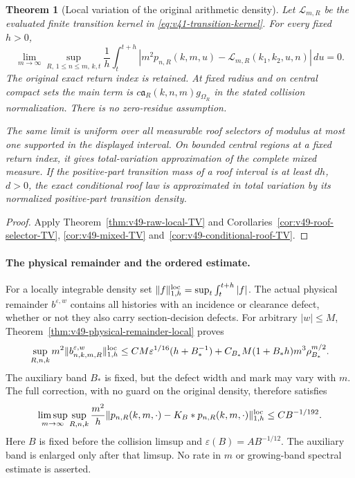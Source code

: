 \documentclass[11pt,reqno]{amsart}
\numberwithin{equation}{section}
\newtheorem{leadtheorem}{Theorem}
\theoremstyle{definition}\newtheorem{definition}[theorem]{Definition}
\theoremstyle{remark}\newtheorem{remark}[theorem]{Remark}
\begin{document}
\begin{leadtheorem}[Local variation of the original arithmetic density]
\label{thm:intro-v49-local-TV}
Let $\mathcal L_{m,R}$ be the evaluated finite transition kernel in
\eqref{eq:v41-transition-kernel}. For every fixed $h>0$,
\[
 \lim_{m\to\infty}\sup_{R,\,1\le n\le m,\,k,t}
 \frac1h\int_t^{t+h}
 |m^2p_{n,R}(k,m,u)-\mathcal L_{m,R}(k_1,k_2,u,n)|\,du=0.
\]
The original exact return index is retained. At fixed radius and on
central compact sets the main term is
$c\mathfrak a_R(k,n,m)g_{\Omega_R}$ in the stated collision
normalization. There is no zero-residue assumption.

The same limit is uniform over all measurable roof selectors of
modulus at most one supported in the displayed interval. On bounded
central regions at a fixed return index, it gives total-variation
approximation of the complete mixed measure. If the positive-part
transition mass of a roof interval is at least $dh$, $d>0$, the exact
conditional roof law is approximated in total variation by its
normalized positive-part transition density.
\end{leadtheorem}
\begin{proof}
Apply Theorem~\ref{thm:v49-raw-local-TV} and
Corollaries~\ref{cor:v49-roof-selector-TV}, \ref{cor:v49-mixed-TV}
and~\ref{cor:v49-conditional-roof-TV}.
\end{proof}

\paragraph{The physical remainder and the ordered estimate.}
For a locally integrable density set
$\|f\|_{1,h}^{\rm loc}=\sup_t\int_t^{t+h}|f|$.
The actual physical remainder $b^{\varepsilon,w}$ contains all
histories with an incidence or clearance defect, whether or not they
also carry section-decision defects. For arbitrary $|w|\le M$,
Theorem~\ref{thm:v49-physical-remainder-local} proves
\[
 \sup_{R,n,k}m^2\|b^{\varepsilon,w}_{n,k,m,R}\|_{1,h}^{\rm loc}
 \le CM\varepsilon^{1/16}(h+B_*^{-1})
       +C_{B_*}M(1+B_*h)m^3\rho_{B_*}^{m/2}.
\]
The auxiliary band $B_*$ is fixed, but the defect width and mark may
vary with $m$. The full correction, with no guard on the original
density, therefore satisfies
\[
 \limsup_{m\to\infty}\sup_{R,n,k}
 \frac{m^2}{h}\|p_{n,R}(k,m,\cdot)-K_B*p_{n,R}(k,m,\cdot)\|_{1,h}^{\rm loc}
                         \le CB^{-1/192}.
\]
Here $B$ is fixed before the collision limsup and
$\varepsilon(B)=AB^{-1/12}$. The auxiliary band is enlarged only
after that limsup. No rate in $m$ or growing-band spectral estimate
is asserted.
\end{document}
